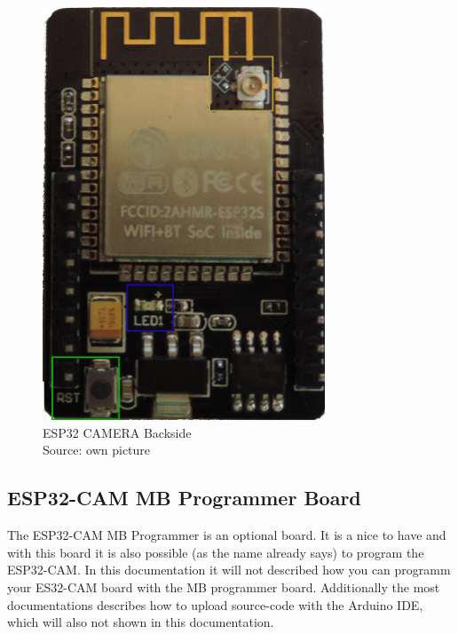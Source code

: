 \begin{figure}[H]
\centering
\includegraphics[width=0.75\textwidth]{esp32-s-cam_backside-components}
\caption[ESP32 CAMERA Backside]{ESP32 CAMERA Backside \\ Source: own picture}
\label{ESP32-CAM-backside}
\end{figure}

\subsection{ESP32-CAM MB Programmer Board}
The ESP32-CAM MB Programmer is an optional board. It is a nice to have and with this board it is also possible (as the name already says) to program the ESP32-CAM. In this documentation it will not described how you can programm your ES32-CAM board with the MB programmer board. Additionally the most documentations describes how to upload source-code with the Arduino IDE, which will also not shown in this documentation.

